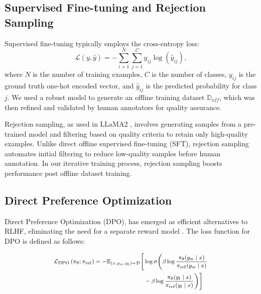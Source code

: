 \documentclass[11pt]{article}
\begin{document}
\subsection{Supervised Fine-tuning and Rejection Sampling}
Supervised fine-tuning typically employs the cross-entropy loss:
\[
\mathcal{L}(y, \hat{y}) = - \sum_{i=1}^{N} \sum_{j=1}^{C} y_{ij} \log(\hat{y}_{ij}),
\]
where \( N \) is the number of training examples, \( C \) is the number of classes, \( y_{ij} \) is the ground truth one-hot encoded vector, and \( \hat{y}_{ij} \) is the predicted probability for class \( j \). We used a robust model to generate an offline training dataset $\mathbb{D}_{off}$, which was then refined and validated by human annotators for quality assurance.

Rejection sampling, as used in LLaMA2 \cite{llama2}, involves generating samples from a pre-trained model and filtering based on quality criteria to retain only high-quality examples. Unlike direct offline supervised fine-tuning (SFT), rejection sampling automates initial filtering to reduce low-quality samples before human annotation. In our iterative training process, rejection sampling boosts performance post offline dataset training.





\subsection{Direct Preference Optimization}
Direct Preference Optimization (DPO), has emerged as efficient alternatives to RLHF, eliminating the need for a separate reward model \cite{dpo,ipo,kto}. The loss function for DPO is defined as follows:

\[
\footnotesize
\begin{aligned}
\mathcal{L}_{\mathrm{DPO}}\left(\pi_\theta ; \pi_{\mathrm{ref}}\right) 
= -\mathbb{E}_{(x, y_w, y_l) \sim \mathcal{D}} \Bigg[ &\log \sigma \Bigg( \beta \log \frac{\pi_\theta (y_w \mid x)}{\pi_{\mathrm{ref}} (y_w \mid x)} \\
&- \beta \log \frac{\pi_\theta (y_l \mid x)}{\pi_{\mathrm{ref}} (y_l \mid x)} \Bigg) \Bigg]
\end{aligned}
\]
\end{document}
